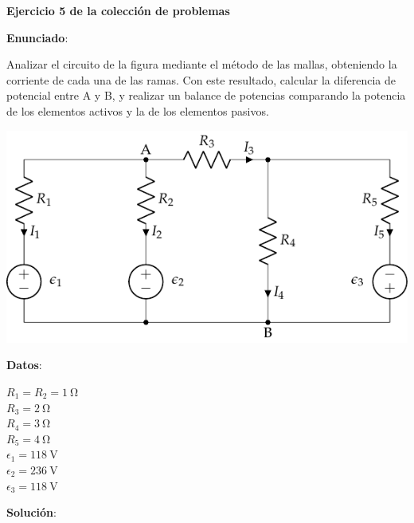 \documentclass[10pt]{article}
\begin{document}
\large{\textbf{Ejercicio 5 de la colección de problemas}}

\vspace{3mm}
\large{\textbf{Enunciado}}:

\vspace{3mm}
Analizar el circuito de la figura mediante el método de las mallas, obteniendo la corriente de cada una de las ramas. Con este resultado, calcular la diferencia de potencial entre A y B, y realizar un balance de potencias comparando la potencia de los elementos activos y la de los elementos pasivos.

\begin{minipage}{0.75\linewidth}
  \includegraphics[scale=1.2]{figs/mallas2.pdf}
\end{minipage}
\begin{minipage}{0.25\linewidth}
    \textbf{Datos}:
    \vspace{2mm}
    
    $R_1 = R_2 = \qty{1}{\ohm}$\\ 
    $R_3 = \qty{2}{\ohm}$\\
    $R_4 = \qty{3}{\ohm}$\\
    $R_5=\qty{4}{\ohm}$\\
    $\epsilon_1=\qty{118}{\volt}$\\
    $\epsilon_2 = \qty{236}{\volt}$\\
    $\epsilon_3 = \qty{118}{\volt}$    
\end{minipage}

\vspace{4mm}

\hrulefill

\vspace{5mm}
\textbf{Solución}:
\vspace{4mm}
\end{document}
